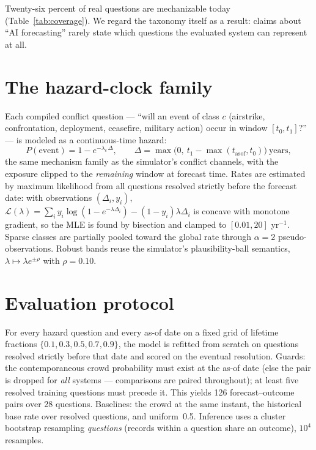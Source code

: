 \documentclass[11pt]{article}
\begin{document}
Twenty-six percent of real questions are mechanizable today
(Table~\ref{tab:coverage}). We regard the taxonomy itself as a result:
claims about ``AI forecasting'' rarely state which questions the evaluated
system can represent at all.

\section{The hazard-clock family}
Each compiled conflict question --- ``will an event of class $c$ (airstrike,
confrontation, deployment, ceasefire, military action) occur in window
$[t_0,t_1]$?'' --- is modeled as a continuous-time hazard:
\[
P(\text{event}) = 1 - e^{-\lambda_c\,\Delta}, \qquad
\Delta = \max\!\bigl(0,\ t_1 - \max(t_{\mathrm{asof}}, t_0)\bigr)\ \text{years},
\]
the same mechanism family as the simulator's conflict channels, with the
exposure clipped to the \emph{remaining} window at forecast time. Rates are
estimated by maximum likelihood from all questions resolved strictly before
the forecast date: with observations $(\Delta_i, y_i)$,
$\mathcal{L}(\lambda) = \sum_i y_i \log(1 - e^{-\lambda\Delta_i})
- (1-y_i)\lambda\Delta_i$ is concave with monotone gradient, so the MLE is
found by bisection and clamped to $[0.01, 20]$ yr$^{-1}$. Sparse classes are
partially pooled toward the global rate through $\alpha{=}2$
pseudo-observations. Robust bands reuse the simulator's plausibility-ball
semantics, $\lambda \mapsto \lambda e^{\pm\rho}$ with $\rho = 0.10$.

\section{Evaluation protocol}
For every hazard question and every as-of date on a fixed grid of lifetime
fractions $\{0.1, 0.3, 0.5, 0.7, 0.9\}$, the model is refitted from scratch on
questions resolved strictly before that date and scored on the eventual
resolution. Guards: the contemporaneous crowd probability must exist at the
as-of date (else the pair is dropped for \emph{all} systems --- comparisons are
paired throughout); at least five resolved training questions must precede it.
This yields 126 forecast--outcome pairs over 28 questions. Baselines: the
crowd at the same instant, the historical base rate over resolved questions,
and uniform~0.5. Inference uses a cluster bootstrap resampling
\emph{questions} (records within a question share an outcome), $10^4$
resamples.
\end{document}
